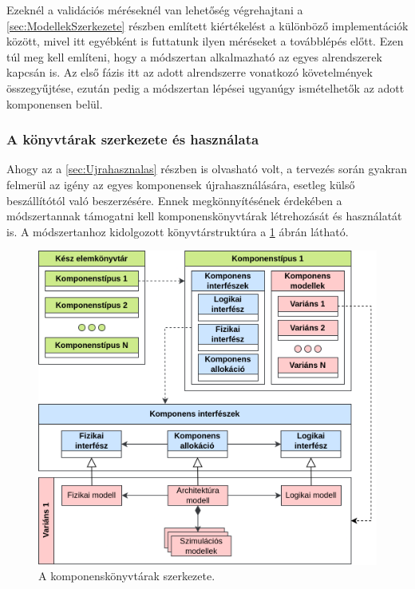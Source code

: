         Ezeknél a validációs méréseknél van lehetőség végrehajtani a \ref{sec:ModellekSzerkezete} részben említett kiértékelést a különböző implementációk között, mivel itt egyébként is futtatunk ilyen méréseket a továbblépés előtt.
        Ezen túl meg kell említeni, hogy a módszertan alkalmazható az egyes alrendszerek kapcsán is. Az első fázis itt az adott alrendszerre vonatkozó követelmények összegyűjtése, ezután pedig a módszertan lépései ugyanúgy ismételhetők az adott komponensen belül.

        \subsubsection{A könyvtárak szerkezete és használata}
        Ahogy az a \ref{sec:Ujrahasznalas} részben is olvasható volt, a tervezés során gyakran felmerül az igény az egyes komponensek újrahasználására, esetleg külső beszállítótól való beszerzésére.
        Ennek megkönnyítésének érdekében a módszertannak támogatni kell komponenskönyvtárak létrehozását és használatát is.
        A módszertanhoz kidolgozott könyvtárstruktúra a \ref{fig:Konyvtar} ábrán látható.
        \begin{figure}[!ht]
            \centering
            \includegraphics[width=150mm, keepaspectratio]{figures/InterfaceParts.drawio.png}
            \caption{A komponenskönyvtárak szerkezete.} 
            \label{fig:Konyvtar}
        \end{figure}

